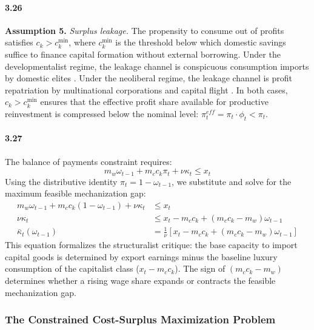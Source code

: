 \paragraph{3.26}
\textbf{Assumption 5.} \textit{Surplus leakage.} The
propensity to consume out of profits satisfies
$c_k > c_k^{\min}$, where $c_k^{\min}$ is the threshold
below which domestic savings suffice to finance capital
formation without external borrowing. Under the
developmentalist regime, the leakage channel is conspicuous
consumption imports by domestic elites
\citep{Prebisch1981, Kaldor1959}. Under the neoliberal
regime, the leakage channel is profit repatriation by
multinational corporations and capital flight
\citep{Ahumada2019}. In both cases, $c_k > c_k^{\min}$
ensures that the effective profit share available for
productive reinvestment is compressed below the nominal
level: $\pi_t^{eff} = \pi_t \cdot \phi_t < \pi_t$.

\paragraph{3.27}
The balance of payments constraint requires:
\begin{equation}
	m_w \omega_{t-1} + m_c c_k \pi_t + \nu \kappa_t \le x_t
	\label{eq:33:bop_full}
\end{equation}
Using the distributive identity $\pi_t = 1 - \omega_{t-1}$,
we substitute and solve for the maximum feasible mechanization
gap:
\begin{align}
	m_w \omega_{t-1} + m_c c_k (1 - \omega_{t-1})
	+ \nu \kappa_t &\le x_t
	\label{eq:33:bop_sub} \\
	\nu \kappa_t &\le x_t - m_c c_k
	+ (m_c c_k - m_w) \omega_{t-1}
	\label{eq:33:bop_solved} \\
	\bar{\kappa}_t(\omega_{t-1})
	&= \frac{1}{\nu} \left[ x_t - m_c c_k
	+ (m_c c_k - m_w) \omega_{t-1} \right]
	\label{eq:33:kappa_bar}
\end{align}
This equation formalizes the structuralist critique: the base
capacity to import capital goods is determined by export
earnings minus the baseline luxury consumption of the
capitalist class ($x_t - m_c c_k$). The sign of
$(m_c c_k - m_w)$ determines whether a rising wage share
expands or contracts the feasible mechanization gap.

\subsubsection{The Constrained Cost-Surplus Maximization
	Problem}

